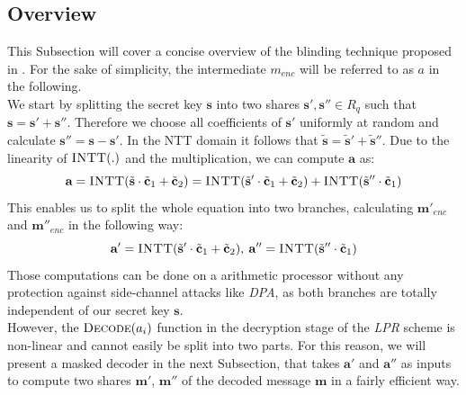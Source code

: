 \subsection{Overview}
This Subsection will cover a concise overview of the blinding technique proposed in \cite{maskedRing}.  For the sake of simplicity, the intermediate \(m_{enc}\) will be referred to as \(a\) in the following.\\
We start by splitting the secret key \(\textbf{s}\) into two shares \(\textbf{s}',\textbf{s}'' \in R_q\) such that \(\textbf{s}=\textbf{s}'+\textbf{s}''\). Therefore we choose all coefficients of \(\textbf{s}'\) uniformly at random and calculate \(\textbf{s}''=\textbf{s}-\textbf{s}'\). In the NTT domain it follows that \(\tilde{\textbf{s}}=\tilde{\textbf{s}}'+\tilde{\textbf{s}}''\). Due to the linearity of \(\textsc{INTT}(.)\) and the multiplication, we can compute \(\textbf{a}\) as:
\begin{equation}
	\textbf{a}=\textsc{INTT}(\tilde{\textbf{s}} \cdot \tilde{\textbf{c}}_1+\tilde{\textbf{c}}_2)=\textsc{INTT}(\tilde{\textbf{s}}' \cdot \tilde{\textbf{c}}_1+\tilde{\textbf{c}}_2)+\textsc{INTT}(\tilde{\textbf{s}}'' \cdot \tilde{\textbf{c}}_1)
\end{equation}
This enables us to split the whole equation into two branches, calculating \(\textbf{m}'_{enc}\) and \(\textbf{m}''_{enc}\) in the following way:
\begin{equation}
	\textbf{a}'=\textsc{INTT}(\tilde{\textbf{s}}' \cdot \tilde{\textbf{c}}_1+\tilde{\textbf{c}}_2),\:\textbf{a}''=\textsc{INTT}(\tilde{\textbf{s}}'' \cdot \tilde{\textbf{c}}_1)
\end{equation}
Those computations can be done on a arithmetic processor without any protection against side-channel attacks like \textit{DPA}, as both branches are totally independent of our secret key \(\textbf{s}\).\\
However, the \(\textsc{Decode}(a_{i})\) function in the decryption stage of the \textit{LPR} scheme is non-linear and cannot easily be split into two parts. For this reason, we will present a masked decoder in the next Subsection, that takes \(\textbf{a}'\) and \(\textbf{a}''\) as inputs to compute two shares \(\textbf{m}'\), \(\textbf{m}''\) of the decoded message \(\textbf{m}\) in a fairly efficient way.

